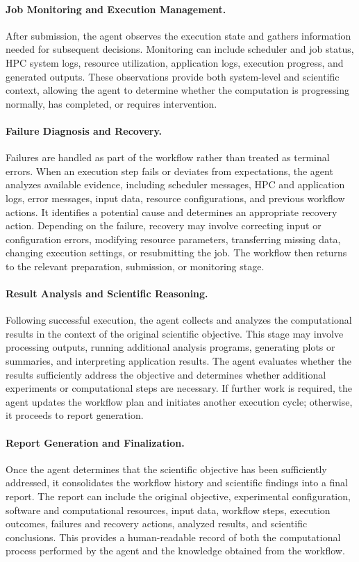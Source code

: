 \documentclass[conference]{IEEEtran}
\begin{document}
\paragraph{Job Monitoring and Execution Management.}
After submission, the agent observes the execution state and
gathers information needed for subsequent decisions. Monitoring
can include scheduler and job status, HPC system logs, resource
utilization, application logs, execution progress, and generated
outputs. These observations provide both system-level and
scientific context, allowing the agent to determine whether the
computation is progressing normally, has completed, or requires
intervention.

\paragraph{Failure Diagnosis and Recovery.}
Failures are handled as part of the workflow rather than treated
as terminal errors. When an execution step fails or deviates
from expectations, the agent analyzes available evidence,
including scheduler messages, HPC and application logs, error
messages, input data, resource configurations, and previous
workflow actions. It identifies a potential cause and determines
an appropriate recovery action. Depending on the failure,
recovery may involve correcting input or configuration errors,
modifying resource parameters, transferring missing data,
changing execution settings, or resubmitting the job. The
workflow then returns to the relevant preparation, submission,
or monitoring stage.

\paragraph{Result Analysis and Scientific Reasoning.}
Following successful execution, the agent collects and analyzes
the computational results in the context of the original
scientific objective. This stage may involve processing outputs,
running additional analysis programs, generating plots or
summaries, and interpreting application results. The agent
evaluates whether the results sufficiently address the objective
and determines whether additional experiments or computational
steps are necessary. If further work is required, the agent
updates the workflow plan and initiates another execution cycle;
otherwise, it proceeds to report generation.

\paragraph{Report Generation and Finalization.}
Once the agent determines that the scientific objective has been
sufficiently addressed, it consolidates the workflow history and
scientific findings into a final report. The report can include
the original objective, experimental configuration, software and
computational resources, input data, workflow steps, execution
outcomes, failures and recovery actions, analyzed results, and
scientific conclusions. This provides a human-readable record of
both the computational process performed by the agent and the
knowledge obtained from the workflow.
\end{document}
